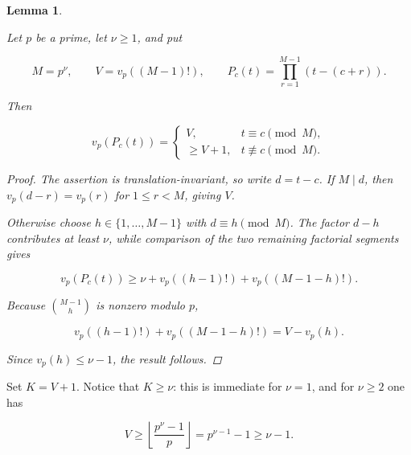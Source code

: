 \documentclass[11pt]{article}
\newtheorem{lemma}[theorem]{Lemma}
\numberwithin{equation}{section}
\begin{document}
\begin{lemma}
\label{lem:fixed-divisor}

Let $p$ be a prime, let $\nu\ge1$, and put

\nopagebreak[4]
\[
M=p^\nu,
\qquad
V=v_p((M-1)!),
\qquad
P_c(t)=\prod_{r=1}^{M-1}(t-(c+r)).
\]

Then

\nopagebreak[4]
\[
v_p(P_c(t))=
\begin{cases}
V,&t\equiv c\pmod M,\\
\ge V+1,&t\not\equiv c\pmod M.
\end{cases}
\]

\begin{proof}

The assertion is translation-invariant, so write $d=t-c$. If $M\mid d$,
then $v_p(d-r)=v_p(r)$ for $1\le r<M$, giving $V$.

Otherwise choose $h\in\{1,\ldots,M-1\}$ with $d\equiv h\pmod M$. The
factor $d-h$ contributes at least $\nu$, while comparison of the two
remaining factorial segments gives

\nopagebreak[4]
\[
v_p(P_c(t))
\ge \nu+v_p((h-1)!)+v_p((M-1-h)!).
\]

Because $\binom{M-1}{h}$ is nonzero modulo $p$,

\nopagebreak[4]
\[
v_p((h-1)!)+v_p((M-1-h)!)=V-v_p(h).
\]

Since $v_p(h)\le\nu-1$, the result follows.
\end{proof}

\end{lemma}


Set $K=V+1$. Notice that $K\ge\nu$: this is immediate for $\nu=1$, and
for $\nu\ge2$ one has

\nopagebreak[4]
\[
V\ge\left\lfloor\frac{p^\nu-1}{p}\right\rfloor
=p^{\nu-1}-1\ge\nu-1.
\]
\end{document}
